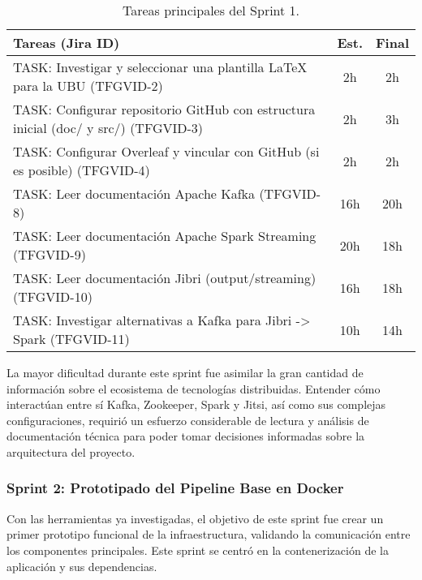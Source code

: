 \begin{table}[H]
    \centering
    \begin{tabular}{|p{}|c|c|}
        \hline
        \rowcolor[HTML]{EFEFEF} 
        \textbf{Tareas (Jira ID)} & \textbf{Est.} & \textbf{Final} \\ \hline
        \rowcolor[HTML]{ECF4FF} 
        TASK: Investigar y seleccionar una plantilla \LaTeX{} para la UBU (TFGVID-2) & 2h & 2h \\
        \rowcolor[HTML]{EFEFEF} 
        TASK: Configurar repositorio GitHub con estructura inicial (doc/ y src/) (TFGVID-3) & 2h & 3h \\
        \rowcolor[HTML]{ECF4FF} 
        TASK: Configurar Overleaf y vincular con GitHub (si es posible) (TFGVID-4) & 2h & 2h \\
        \rowcolor[HTML]{EFEFEF} 
        TASK: Leer documentación Apache Kafka (TFGVID-8) & 16h & 20h \\
        \rowcolor[HTML]{ECF4FF} 
        TASK: Leer documentación Apache Spark Streaming (TFGVID-9) & 20h & 18h \\
        \rowcolor[HTML]{EFEFEF} 
        TASK: Leer documentación Jibri (output/streaming) (TFGVID-10) & 16h & 18h \\
        \rowcolor[HTML]{ECF4FF} 
        TASK: Investigar alternativas a Kafka para Jibri -> Spark (TFGVID-11) & 10h & 14h \\
        \hline
    \end{tabular}
    \caption{Tareas principales del Sprint 1.}
    \label{tab:sprint1}
\end{table}

La mayor dificultad durante este sprint fue asimilar la gran cantidad de información sobre el ecosistema de tecnologías distribuidas. Entender cómo interactúan entre sí Kafka, Zookeeper, Spark y Jitsi, así como sus complejas configuraciones, requirió un esfuerzo considerable de lectura y análisis de documentación técnica para poder tomar decisiones informadas sobre la arquitectura del proyecto.

\subsubsection{Sprint 2: Prototipado del Pipeline Base en Docker}
Con las herramientas ya investigadas, el objetivo de este sprint fue crear un primer prototipo funcional de la infraestructura, validando la comunicación entre los componentes principales. Este sprint se centró en la contenerización de la aplicación y sus dependencias.

